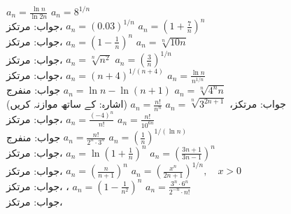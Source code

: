 $a_n=\frac{\ln n}{\ln 2n}$
$a_n=8^{1/n}$\\
جواب:\quad
مرتکز، 
$a_n=(0.03)^{1/n}$
$a_n=(1+\tfrac{7}{n})^n$\\
جواب:\quad
مرتکز، 
$a_n=(1-\tfrac{1}{n})^n$
$a_n=\sqrt[n]{10n}$\\
جواب:\quad
مرتکز، 
$a_n=\sqrt[n]{n^2}$
$a_n=(\tfrac{3}{n})^{1/n}$\\
جواب:\quad
مرتکز، 
$a_n=(n+4)^{1/(n+4)}$
$a_n=\frac{\ln n}{n^{1/n}}$\\
جواب:\quad
منفرج
$a_n=\ln n-\ln(n+1)$
$a_n=\sqrt[n]{4^nn}$\\
جواب:\quad
مرتکز، 
$a_n=\sqrt[n]{3^{2n+1}}$
$a_n=\frac{n!}{n^n}$\quad
(اشارہ:  کے ساتھ موازنہ کریں) \\
جواب:\quad
مرتکز، 
$a_n=\frac{(-4)^n}{n!}$
$a_n=\frac{n!}{10^{6n}}$\\
جواب:\quad
منفرج
$a_n=\frac{n!}{2^n\cdot 3^n}$
$a_n=(\tfrac{1}{n})^{1/(\ln n)}$\\
جواب:\quad
مرتکز، 
$a_n=\ln(1+\tfrac{1}{n})^n$
$a_n=(\tfrac{3n+1}{3n-1})^n$\\
جواب:\quad
مرتکز، 
$a_n=(\tfrac{n}{n+1})^n$
$a_n=(\tfrac{x^n}{2n+1})^{1/n},\quad x>0$\\
جواب:\quad
مرتکز، ، 
$a_n=(1-\tfrac{1}{n^2})^n$
$a_n=\frac{3^n\cdot 6^n}{2^{-n}\cdot n!}$\\
جواب:\quad
مرتکز، 
